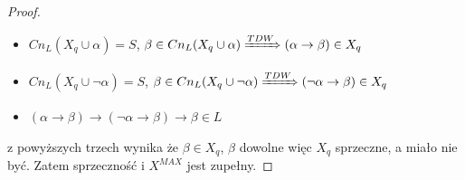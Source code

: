 \documentclass[10pt,a4paper]{article}
\theoremstyle{plain}
\theoremstyle{definition}
\begin{document}
\begin{proof}
\begin{itemize}
\item $Cn_L(X_q \cup {\alpha}) = S$, $\beta \in Cn_L(X_q \cup {\alpha}) 
\xRightarrow{TDW} (\alpha \rightarrow \beta) \in X_q$
\item $Cn_L(X_q \cup {\neg \alpha}) = S$, 
$\beta \in Cn_L(X_q \cup {\neg \alpha}) \xRightarrow{TDW} 
(\neg \alpha \rightarrow \beta) \in X_q$
\item $(\alpha \rightarrow \beta) \rightarrow (\neg \alpha \rightarrow \beta) 
\rightarrow \beta \in L$
\end{itemize}
z powyższych trzech wynika że $\beta \in X_q$, 
$\beta$ dowolne więc $X_q$ sprzeczne, a miało nie być. 
Zatem sprzeczność i $X^{MAX}$ jest zupełny.

\end{proof}
\end{document}
